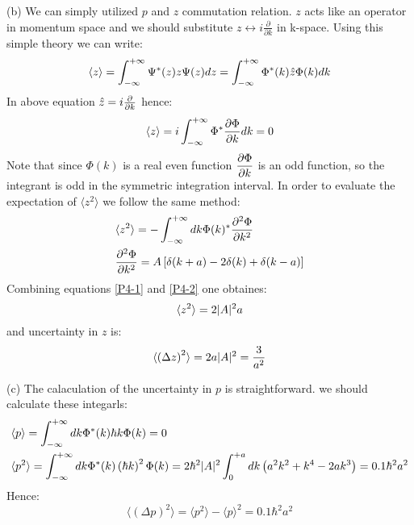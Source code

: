 \begin{homeworkProblem}
\begin{homeworkSection}{(b)}
  We can simply utilized $p$ and $z$ commutation relation. $z$ acts like an operator in momentum space and we should substitute $z\leftrightarrow i\frac{\partial}{\partial k}$ in k-space. Using this simple theory we can write:
\begin{equation}
\langle z\rangle=\int_{-\infty}^{+\infty}\Psi^*(z)z\Psi(z) dz=\int_{-\infty}^{+\infty}\Phi^*(k)\Hat{z}\Phi(k)dk
\end{equation} 
In above equation $\Hat{z}=i\frac{\partial}{\partial k}$ hence:
\begin{equation}
\langle z\rangle=i\int_{-\infty}^{+\infty}\Phi^*\dfrac{\partial \Phi}{\partial k}dk=0
\end{equation}
Note that since $\Phi(k)$ is a real even function $\dfrac{\partial \Phi}{\partial k}$ is an odd function, so the integrant is odd  in the symmetric integration interval. In order to evaluate the expectation of $\langle z^2\rangle$ we follow the same method:
\begin{align}
&\langle z^2\rangle=-\int_{-\infty}^{+\infty}dk\Phi(k)^*\dfrac{\partial^2 {\Phi}}{\partial {k}^2}\label{P4-1}\\
&\dfrac{\partial^2 {\Phi}}{\partial {k}^2}=A\left[\delta(k+a)-2\delta(k)+\delta(k-a)\right]\label{P4-2}
\end{align}
Combining equations \eqref{P4-1} and \eqref{P4-2} one obtaines:
\begin{equation}
\langle z^2\rangle=2\lvert A\rvert^2a
\end{equation}
and uncertainty in $z$ is:
\begin{equation}
\langle\left(\Delta z\right)^2\rangle= 2a\lvert A\rvert^2=\frac{3}{a^2}
\end{equation}

\end{homeworkSection}

\begin{homeworkSection}{(c)}
 The calaculation of the uncertainty in $p$ is straightforward. we should calculate these integarls:
\begin{align}
&\langle p\rangle=\int_{-\infty}^{+\infty}dk \Phi^*(k)\hbar k\Phi(k)=0\\
&\langle p^2\rangle =\int_{-\infty}^{+\infty}dk \Phi^*(k)\left(\hbar k\right)^2\Phi(k)=2\hbar^2\lvert A\rvert^2\int_{0}^{+a}dk\left(a^2k^2+k^4-2ak^3\right)=0.1\hbar^2a^2
\end{align} 
Hence:
\begin{equation}
\langle\left(\Delta p\right)^2\rangle=\langle p^2\rangle-\langle p\rangle^2= 0.1\hbar^2 a^2
\end{equation}


\end{homeworkSection}



\end{homeworkProblem}

